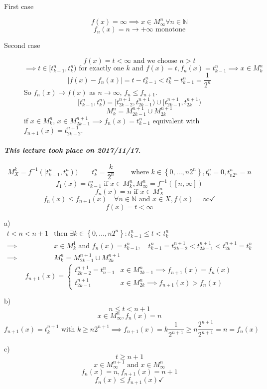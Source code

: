 \documentclass{article}
\newcommand{\set}[1]{\left\{#1\right\}}
\newcommand{\card}[1]{\left|#1\right|}
\newcommand{\dateref}[1]{\paragraph{\textit{This lecture took place on #1.}}}
\begin{document}
\begin{description}
  \item[First case]
    \[ f(x) = \infty \implies x \in M_{\infty}^n \forall n \in \mathbb N \]
    \[ f_n(x) = n \to +\infty \text{ monotone} \]
  \item[Second case]
    \[ f(x) = t < \infty \text{ and we choose } n > t \]
    \[ \implies t \in [t_{k-1}^n, t_k^n) \text{ for exactly one } k \text{ and } f(x) = t, f_n(x) = t_{k-1}^n \implies x \in M_k^n \]
    \[ \card{f(x) - f_n(x)} = t - t_{k-1}^n < t_k^n - t_{k-1}^n = \frac{1}{2^n} \]
    So $f_n(x) \to f(x)$ as $n \to \infty$, $f_n \leq f_{n+1}$.
    \[ [t_{k-1}^n, t_k^n) = [t_{2k-2}^{n+1}, t_{2k-1}^{n+1}) \cup [t_{2k-1}^{n+1}, t_{2k}^{n+1}) \]
    \[ M_k^n = M_{2k-1}^{n+1} \cup M_{2k}^{n+1} \]
    if $x \in M_{k}^n$, $x \in M_{2k-1}^{n+1} \implies f_n(x) = t_{k-1}^n$ equivalent with $f_{n+1}(x) = t_{2k-2}^{n+1}$.
\end{description}

\dateref{2017/11/17}

\[ M_X^k = f^{-1}([t_{k-1}^n, t_k^n)) \qquad t_k^n = \frac{k}{2^n} \qquad \text{ where } k\in\set{0,\ldots,n2^n}, t_0^n = 0, t_{n2^n}^n = n \]
\[ f_1(x) = t_{k-1}^n \text{ if } x \in M_k^n, M_\infty^n = f^{-1}([n,\infty]) \]
\[ f_n(x) = n \text{ if } x \in M_X^n \]
\[ f_n(x) \leq f_{n+1}(x) \quad \forall n \in \mathbb N \text{ and } x \in X, f(x) = \infty \checkmark \]
\[ f(x) = t < \infty \]

a)
\begin{align*}
  t < n < n + 1 &\text{then } \exists k \in \set{0,\ldots,n2^n}: t_{k-1}^n \leq t < t_k^n \\
  \implies & x \in M_k^1 \text{ and } f_n(x) = t_{k-1}^n, \quad t_{k-1}^n = t_{2k-2}^{n+1} < t_{2k-1}^{n+1} < t_{2k}^{n+1} = t_k^n \\
  \implies & M_k^n = M_{2k-1}^{n+1} \cup M_{2k}^{n+1}
\end{align*}
\[
  f_{n+1}(x) = \begin{cases}
    t_{2k-2}^{n+1} = t_{n-1}^n & x \in M_{2k-1}^n \implies f_{n+1}(x) = f_n(x) \\
    t_{2k-1}^{n+1} & x \in M_{2k}^n \implies f_{n+1}(x) > f_n(x)
  \end{cases}
\]

b)
\[ n \leq t < n+1 \]
\[ x \in M_{\infty}^n, f_n(x) = n \]
\[ f_{n+1}(x) = t_{k}^{n+1} \text{ with } k \geq n2^{n+1} \implies f_{n+1}(x) = k \frac{1}{2^{n+1}} \geq n \frac{2^{n+1}}{2^{n+1}} = n = f_n(x) \]

c)
\[ t \geq n + 1 \]
\[ x \in M_{\infty}^{n+1} \text{ and } x \in M_{\infty}^n \]
\[ f_n(x) = n, f_{n+1}(x) = n+1 \]
\[ f_n(x) \leq f_{n+1}(x) \checkmark \]
\end{document}
